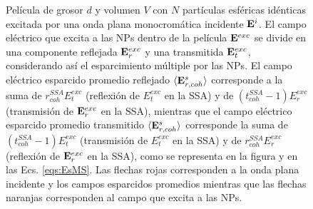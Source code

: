 \begin{figure}[h!]
		\caption{Película de grosor $d$ y volumen $V$ con $N$ partículas esféricas idénticas excitada por una onda plana monocromática incidente $\vb{E}^i$. El campo eléctrico que excita a las NPs dentro de la película $\vb{E}^{exc}$ se divide en una componente reflejada $ \vb{E}^{exc}_r$ y una transmitida $ \vb{E}^{exc}_t$, considerando así el esparcimiento múltiple por las NPs. El campo eléctrico esparcido promedio reflejado $\langle \vb{E}^s_{r,coh}\rangle$ corresponde a la suma de $r^{\textit{SSA}}_{coh}{E}^{exc}_t$ (reflexión de ${E}^{exc}_t$ en la SSA) y de $(t^{\textit{SSA}}_{coh}-1){E}^{exc}_r$ (transmisión de $\vb{E}^{exc}_r$ en la SSA), mientras que el  campo eléctrico esparcido promedio transmitido $\langle \vb{E}^s_{r,coh}\rangle$ corresponde  la suma de $(t^{\textit{SSA}}_{coh}-1){E}^{exc}_t$ (transmisión de ${E}^{exc}_t$ en la SSA) y de $r^{\textit{SSA}}_{coh}{E}^{exc}_r$ (reflexión de $\vb{E}^{exc}_r$ en la SSA), como se representa en la figura y en las Ecs. \eqref{eqs:EsMS}. Las flechas rojas corresponden a la onda plana incidente y los campos esparcidos promedios mientras que las flechas naranjas corresponden al campo que excita a las NPs. }\label{fig:MScatt-slab-MS}
	\end{figure}	
	
